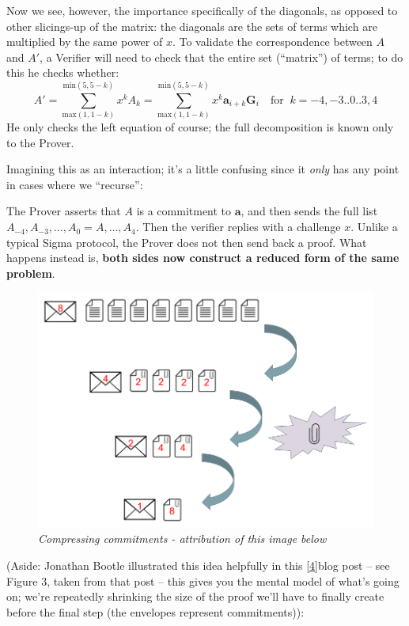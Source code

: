 \documentclass[10pt,a4paper]{article}
\begin{document}
Now we see, however, the importance specifically of the diagonals, as
opposed to other slicings-up of the matrix: the diagonals are the sets
of terms which are multiplied by the same power of $x$. To validate the
correspondence between $A$ and $A'$, a Verifier will need to check that the
entire set (``matrix'') of terms; to do this he checks whether:
\[
A' = \sum\limits_{\textrm{max}(1, 1-k)}^{\textrm{min}(5, 5-k)}x^k A_k = \sum\limits_{\textrm{max}(1, 1-k)}^{\textrm{min}(5, 5-k)} x^k \textbf{a}_{i+k}\textbf{G}_i \quad \textrm{for }\ k=-4,-3..0..3,4
\]
He only checks the left equation of course; the full decomposition is
known only to the Prover.

Imagining this as an interaction; it's a little confusing since it
\emph{only }has any point in cases where we ``recurse'':

The Prover asserts that $A$ is a commitment to $\mathbf{a}$, and then sends the full
list $A_{-4}, A_{-3}, \ldots, A_0=A, \ldots, A_{4}$. Then the verifier replies with a challenge $x$. Unlike a typical
Sigma protocol, the Prover does not then send back a proof. What happens
instead is, \textbf{both sides now construct a reduced form of the same
problem}.
\begin{figure}[h]
\raggedright
\includegraphics[scale=0.5]{images/bootlesavings.png}
\caption{\emph{Compressing commitments - attribution of this image below}}
\end{figure}
(Aside:
Jonathan Bootle illustrated this idea helpfully in this
{[}\protect\hyperlink{anchor-44}{4}{]}blog post -- see Figure 3, taken
from that post -- this gives you the mental model of what's going on;
we're repeatedly shrinking the size of the proof we'll have to finally
create before the final step (the envelopes represent commitments)):
\end{document}
